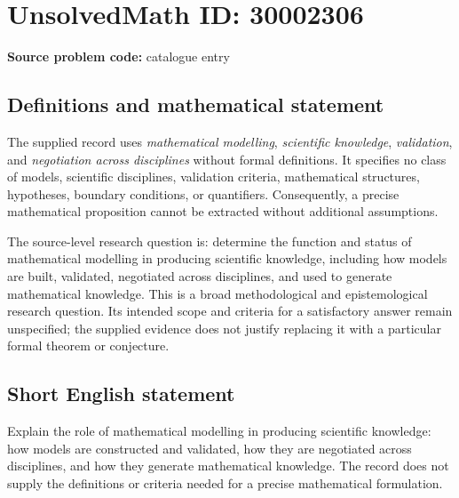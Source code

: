\documentclass[11pt]{article}
\begin{document}
\section*{UnsolvedMath ID: 30002306}
\textbf{Source problem code:} catalogue entry
\subsection{Definitions and mathematical statement}
The supplied record uses \emph{mathematical modelling}, \emph{scientific knowledge}, \emph{validation}, and \emph{negotiation across disciplines} without formal definitions. It specifies no class of models, scientific disciplines, validation criteria, mathematical structures, hypotheses, boundary conditions, or quantifiers. Consequently, a precise mathematical proposition cannot be extracted without additional assumptions.

The source-level research question is: determine the function and status of mathematical modelling in producing scientific knowledge, including how models are built, validated, negotiated across disciplines, and used to generate mathematical knowledge. This is a broad methodological and epistemological research question. Its intended scope and criteria for a satisfactory answer remain unspecified; the supplied evidence does not justify replacing it with a particular formal theorem or conjecture.
\subsection{Short English statement}
Explain the role of mathematical modelling in producing scientific knowledge: how models are constructed and validated, how they are negotiated across disciplines, and how they generate mathematical knowledge. The record does not supply the definitions or criteria needed for a precise mathematical formulation.
\end{document}
